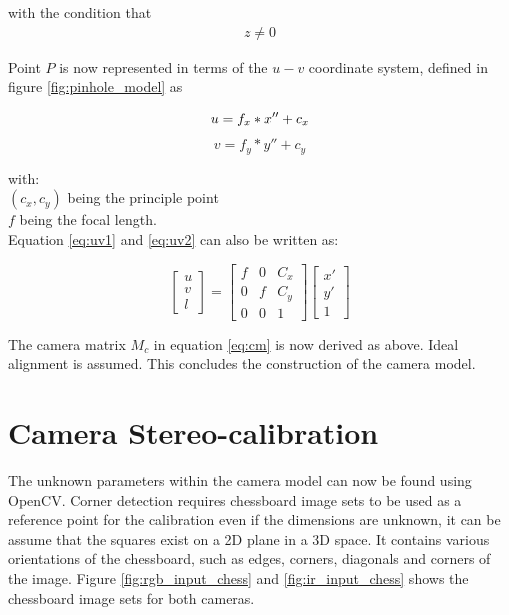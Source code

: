 with the condition that \begin{align*} z \neq 0 \end{align*}

Point $P$ is now represented in terms of the $u-v$ coordinate system, defined in figure \ref{fig:pinhole_model} as 

\begin{equation}\label{eq:uv1}u = f_x*x'' + c_x \\ \end{equation}
\begin{equation}\label{eq:uv2}v = f_y*y'' + c_y \end{equation}

with:\\
$(c_x, c_y)$ being the principle point\\
$f$ being the focal length.\\

Equation \ref{eq:uv1} and \ref{eq:uv2} can also be written as:

\begin{equation}
\begin{bmatrix}u\\v\\l\end{bmatrix} =  
\begin{bmatrix}
f & 0 & C_x\\
0 & f & C_y\\
0 & 0 & 1
\end{bmatrix}
\begin{bmatrix}x'\\y'\\1\end{bmatrix}
\end{equation}

The camera matrix $M_c$ in equation \ref{eq:cm} is now derived as above. Ideal alignment is assumed. This concludes the construction of the camera model.

\section{Camera Stereo-calibration}
\label{sec:cal_technique}

The unknown parameters within the camera model can now be found using OpenCV. Corner detection requires chessboard image sets to be used as a reference point for the calibration even if the dimensions are unknown, it can be assume that the squares exist on a 2D plane in a 3D space. It contains various orientations of the chessboard, such as edges, corners, diagonals and corners of the image. Figure \ref{fig:rgb_input_chess} and \ref{fig:ir_input_chess} shows the chessboard image sets for both cameras.\\

